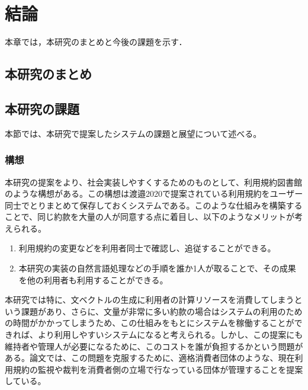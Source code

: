 \chapter{結論}
\label{conclusion}

本章では，本研究のまとめと今後の課題を示す．

\section{本研究のまとめ}

\section{本研究の課題}
本節では、本研究で提案したシステムの課題と展望について述べる。

\subsection{構想}
本研究の提案をより、社会実装しやすくするためのものとして、利用規約図書館のような構想がある。この構想は渡邉2020で提案されている利用規約をユーザー同士でとりまとめて保存しておくシステムである。このような仕組みを構築することで、同じ約款を大量の人が同意する点に着目し、以下のようなメリットが考えられる。
\begin{enumerate}
  \item 利用規約の変更などを利用者同士で確認し、追従することができる。
  \item 本研究の実装の自然言語処理などの手順を誰か1人が取ることで、その成果を他の利用者も利用することができる。
\end{enumerate}
本研究では特に、文ベクトルの生成に利用者の計算リソースを消費してしまうという課題があり、さらに、文量が非常に多い約款の場合はシステムの利用のための時間がかかってしまうため、この仕組みをもとにシステムを稼働することができれば、より利用しやすいシステムになると考えられる。しかし、この提案にも維持者や管理人が必要になるために、このコストを誰が負担するかという問題がある。論文では、この問題を克服するために、適格消費者団体のような、現在利用規約の監視や裁判を消費者側の立場で行なっている団体が管理することを提案している。 



